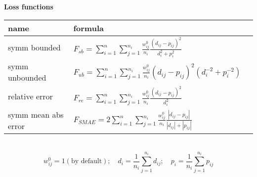 \documentclass[12pt]{article}\usepackage{a4wide}
\begin{document}
\noindent
\begin{center}
{\large\bf Loss functions}\\[2mm]
\begin{tabular}{lll}\hline
name & formula\\ 
\hline
symm bounded & 
$F_{sb} = \sum_{i=1}^n \sum_{j=1}^{n_i} \frac{w_{ij}^0} {n_i} \frac{(d_{ij} - p_{ij})^2} {d_i^2 + p_i^2}$\\[2mm]
	
symm unbounded & 
$F_{ub} = \sum_{i=1}^n \sum_{j=1}^{n_i} \frac{w_{ij}^0} {n_i} (d_{ij} - p_{ij})^2 (d_i^{-2} + p_i^{-2})$\\[2mm]

relative error & 
$F_{re} = \sum_{i=1}^n \sum_{j=1}^{n_i} \frac{w_{ij}^0} {n_i} \frac{(d_{ij} - p_{ij})^2} {d_i^2}$\\[2mm]
	
symm mean abs error &	
$F_{SMAE} = 2 \sum_{i=1}^n \sum_{j=1}^{n_i} \frac{w_{ij}^0} {n_i} \frac{|d _{ij}- p_{ij}|} {|d_{ij}| + |p_{ij}|}$\\	
\hline
\end{tabular}\\

\[
  w_{ij}^0 = 1 (\mbox{by default});  \quad
  d_i = \frac{1}{n_i} \sum_{j=1}^{n_i} d_{ij}; \quad
  p_i = \frac{1}{n_i} \sum_{j=1}^{n_i} p_{ij}
\]
	
\end{center}
\end{document}
